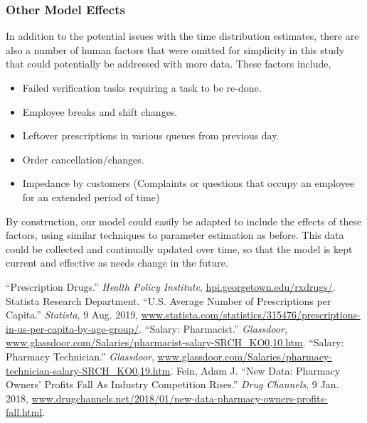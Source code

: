 \documentclass[10pt]{report}            %
\begin{document}
\subsubsection*{Other Model Effects}
In addition to the potential issues with the time distribution estimates, there are also a number of human factors that were omitted for simplicity in this study that could potentially be addressed with more data. These factors include,
\begin{itemize}
\item Failed verification tasks requiring a task to be re-done.
\item Employee breaks and shift changes.
\item Leftover prescriptions in various queues from previous day.
\item Order cancellation/changes.
\item Impedance by customers (Complaints or questions that occupy an employee for an extended period of time)
\end{itemize}
By construction, our model could easily be adapted to include the effects of these factors, using similar techniques to parameter estimation as before. This data could be collected and continually updated over time, so that the model is kept current and effective as needs change in the future.

\begin{thebibliography}{9}
 ``Prescription Drugs.” \textit{Health Policy Institute}, \url{hpi.georgetown.edu/rxdrugs/}.
 Statista Research Department. ``U.S. Average Number of Prescriptions per Capita.” \textit{Statista}, 9 Aug. 2019, \url{www.statista.com/statistics/315476/prescriptions-in-us-per-capita-by-age-group/}.
 ``Salary: Pharmacist.” \textit{Glassdoor}, \url{www.glassdoor.com/Salaries/pharmacist-salary-SRCH_KO0,10.htm}.
 ``Salary: Pharmacy Technician.” \textit{Glassdoor}, \url{www.glassdoor.com/Salaries/pharmacy-technician-salary-SRCH_KO0,19.htm}.
 Fein, Adam J. ``New Data: Pharmacy Owners' Profits Fall As Industry Competition Rises.” \textit{Drug Channels}, 9 Jan. 2018, \url{www.drugchannels.net/2018/01/new-data-pharmacy-owners-profits-fall.html}.
\end{thebibliography}
\end{document}
